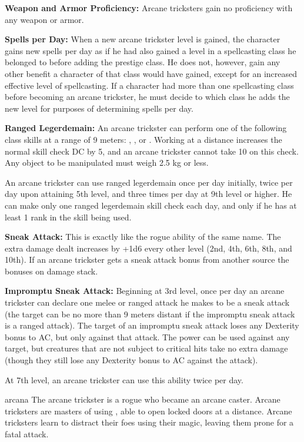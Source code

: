 {
\textbf{Weapon and Armor Proficiency:} Arcane tricksters gain no proficiency with any weapon or armor.

\textbf{Spells per Day:} When a new arcane trickster level is gained, the character gains new spells per day as if he had also gained a level in a spellcasting class he belonged to before adding the prestige class. He does not, however, gain any other benefit a character of that class would have gained, except for an increased effective level of spellcasting. If a character had more than one spellcasting class before becoming an arcane trickster, he must decide to which class he adds the new level for purposes of determining spells per day.

\textbf{Ranged Legerdemain:} An arcane trickster can perform one of the following class skills at a range of 9 meters: , , or . Working at a distance increases the normal skill check DC by 5, and an arcane trickster cannot take 10 on this check. Any object to be manipulated must weigh 2.5 kg or less.

An arcane trickster can use ranged legerdemain once per day initially, twice per day upon attaining 5th level, and three times per day at 9th level or higher. He can make only one ranged legerdemain skill check each day, and only if he has at least 1 rank in the skill being used.

\textbf{Sneak Attack:} This is exactly like the rogue ability of the same name. The extra damage dealt increases by +1d6 every other level (2nd, 4th, 6th, 8th, and 10th). If an arcane trickster gets a sneak attack bonus from another source the bonuses on damage stack.

\textbf{Impromptu Sneak Attack:} Beginning at 3rd level, once per day an arcane trickster can declare one melee or ranged attack he makes to be a sneak attack (the target can be no more than 9 meters distant if the impromptu sneak attack is a ranged attack). The target of an impromptu sneak attack loses any Dexterity bonus to AC, but only against that attack. The power can be used against any target, but creatures that are not subject to critical hits take no extra damage (though they still lose any Dexterity bonus to AC against the attack).

At 7th level, an arcane trickster can use this ability twice per day.
}
{}
{arcana}
{The arcane trickster is a rogue who became an arcane caster.}
{Arcane tricksters are masters of using , able to open locked doors at a distance.}
{Arcane tricksters learn to distract their foes using their magic, leaving them prone for a fatal attack.}